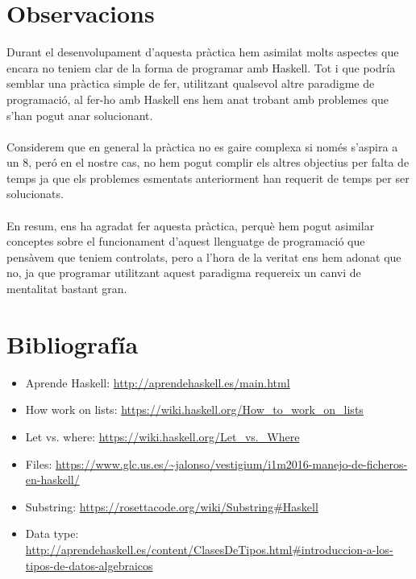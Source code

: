 \documentclass[12pt]{article}
\begin{document}
\newpage


\section{Observacions}
Durant el desenvolupament d'aquesta pràctica hem asimilat molts aspectes que encara no teniem clar de la forma de programar amb Haskell. Tot i que podría semblar una pràctica simple de fer, utilitzant qualsevol altre paradigme de programació, al fer-ho amb Haskell ens hem anat trobant amb problemes que s'han pogut anar solucionant.
\\
\\
Considerem que en general la pràctica no es gaire complexa si només s'aspira a un 8, peró
 en el nostre cas, no hem pogut complir els altres objectius per falta de temps ja que els problemes esmentats anteriorment han requerit de temps per ser solucionats.
\\
\\
En resum, ens ha agradat fer aquesta pràctica, perquè hem pogut asimilar conceptes sobre el funcionament d'aquest llenguatge de programació que pensàvem que teniem controlats, pero a l'hora de la veritat ens hem adonat que no, ja que programar utilitzant aquest paradigma requereix un canvi de mentalitat bastant gran.

\newpage
\section{Bibliografía}

\begin{itemize}[label={}]

\item Aprende Haskell: \url{http://aprendehaskell.es/main.html}
\item How work on lists: \url{https://wiki.haskell.org/How_to_work_on_lists}
\item Let vs. where: \url{https://wiki.haskell.org/Let_vs._Where}
\item Files: \url{https://www.glc.us.es/~jalonso/vestigium/i1m2016-manejo-de-ficheros-en-haskell/}
\item Substring: \url{https://rosettacode.org/wiki/Substring#Haskell}
\item Data type: \url{http://aprendehaskell.es/content/ClasesDeTipos.html#introduccion-a-los-tipos-de-datos-algebraicos}

\end{itemize}
\end{document}
